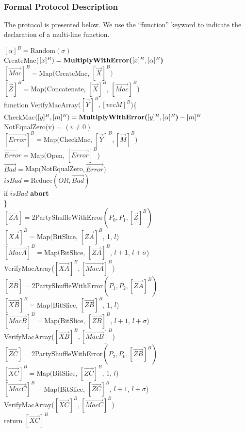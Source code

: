 \subsubsection{Formal Protocol Description}
The protocol is presented below. 
We use the ``function'' keyword to indicate the declaration of a 
multi-line function.

\begin{protocol}[Shuffle$({[\vec{X}]^B})$]
	$[\alpha]^{B} = $Random$(\sigma)$\\
	CreateMac($[x]^B) = \textbf{MultiplyWithError(}[x]^B, [\alpha]^B\textbf{)}$\\
	\noindent $[\vec{Mac}]^{B} = $Map$($CreateMac, $[\Vec{X}]^B)$\\
	$[\vec{Z}]^{B} = $Map$($Concatenate, $[\vec{X}]^B$, $[\vec{Mac}]^B$)\\

	\noindent function VerifyMacArray$([\vec{Y}]^B, [vec{M}]^B$)\{ \\
		\indent CheckMac$([y]^B, [m]^B) = \textbf{MultiplyWithError(}[y]^B, [\alpha]^B\textbf{)} - [m]^B$\\
		\indent NotEqualZero(v) = $(v \neq 0)$\\
		\indent $[\vec{Error}]^B = $Map$($CheckMac, $[\vec{Y}]^B, [\vec{M}]^B)$\\
		\indent $\vec{Error} = $Map$($Open, $[\vec{Error}]^B$)\\
		\indent $\vec{Bad} = $Map$($NotEqualZero$, \vec{Error})$\\
		\indent $isBad = $Reduce$(OR, \vec{Bad})$\\
		\indent if $isBad$ \textbf{abort}\\
	\}\\	

	\noindent $[\vec{ZA}] = $2PartyShuffleWithError$(P_0, P_1, [\vec{Z}]^B)$\\
	$[\vec{XA}]^B = $Map$($BitSlice, $[\vec{ZA}]^B$, 1, $l$)\\
	$[\vec{MacA}]^B = $Map$($BitSlice, $[\vec{ZA}]^B$, $l+1$, $l + \sigma$)\\	
	VerifyMacArray($[\vec{XA}]^B, [\vec{MacA}]^B$)\\

	\noindent $[\vec{ZB}] = $2PartyShuffleWithError$(P_1, P_2, [\vec{ZA}]^B)$\\
	$[\vec{XB}]^B = $Map$($BitSlice, $[\vec{ZB}]^B$, 1, $l$)\\
	$[\vec{MacB}]^B = $Map$($BitSlice, $[\vec{ZB}]^B$, $l+1$, $l + \sigma$)\\	
	VerifyMacArray($[\vec{XB}]^B, [\vec{MacB}]^B$)\\

	\noindent $[\vec{ZC}] = $2PartyShuffleWithError$(P_2, P_0, [\vec{ZB}]^B)$\\
	$[\vec{XC}]^B = $Map$($BitSlice, $[\vec{ZC}]^B$, 1, $l$)\\
	$[\vec{MacC}]^B = $Map$($BitSlice, $[\vec{ZC}]^B$, $l+1$, $l + \sigma$)\\
	VerifyMacArray($[\vec{XC}]^B, [\vec{MacC}]^B$)\\

	\noindent return $[\vec{XC}]^B$
\end{protocol}


